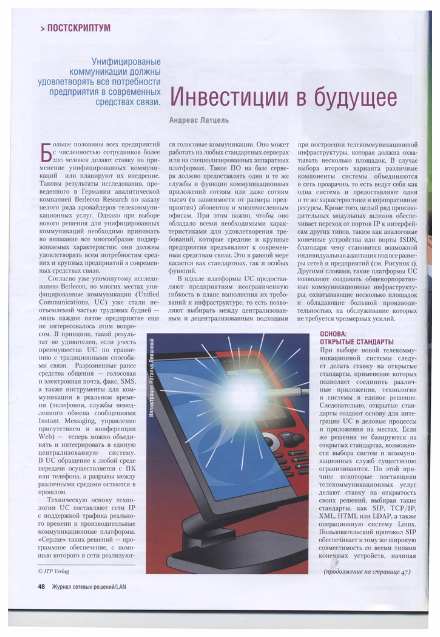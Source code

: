 \documentclass{book}
\begin{document}
\begin{figure}[H]
\begin{center}
\includegraphics[scale=0.25]{images/50.jpg}

\end{center}
\end{figure}
\end{document}
